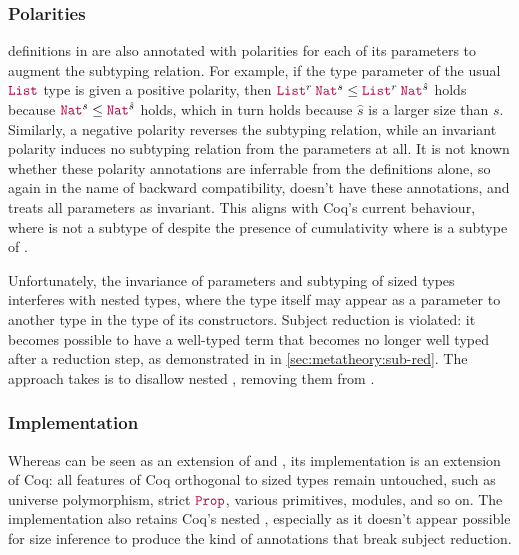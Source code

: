 \subsubsection{Polarities}

\Coinductive definitions in \CIChatminus are also annotated with polarities for each of its parameters to augment the subtyping relation.
For example, if the type parameter of the usual $\List$ type is given a positive polarity,
then $\app{\List^r}{\Nat^s} \leq \app{\List^r}{\Nat^{\hat{s}}}$ holds
because $\Nat^s \leq \Nat^{\hat{s}}$ holds,
which in turn holds because $\hat{s}$ is a larger size than $s$.
Similarly, a negative polarity reverses the subtyping relation,
while an invariant polarity induces no subtyping relation from the parameters at all.
It is not known whether these polarity annotations are inferrable from the \coinductive definitions alone,
so again in the name of backward compatibility, \lang doesn't have these annotations,
and treats all parameters as invariant.
This aligns with Coq's current behaviour, where  is not a subtype of 
despite the presence of cumulativity where  is a subtype of .

Unfortunately, the invariance of parameters and subtyping of sized \coinductive types interferes with nested \coinductive types,
where the type itself may appear as a parameter to another type in the type of its constructors.
Subject reduction is violated: it becomes possible to have a well-typed term that becomes no longer well typed after a reduction step,
as demonstrated in in \autoref{sec:metatheory:sub-red}.
The approach \lang takes is to disallow nested \coinductives, removing them from \CIChat.

\subsubsection{Implementation}

Whereas \lang can be seen as an extension of \CIChat and \CChatomega,
its implementation is an extension of Coq:
all features of Coq orthogonal to sized types remain untouched,
such as universe polymorphism, strict $\Prop$, various primitives, modules, and so on.
The implementation also retains Coq's nested \coinductives,
especially as it doesn't appear possible for size inference to produce the kind of annotations that break subject reduction.

